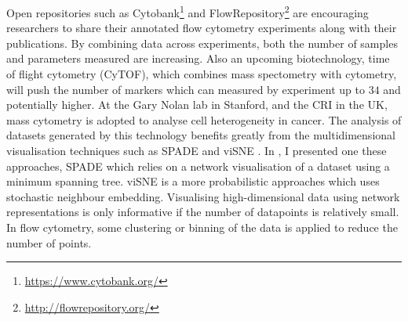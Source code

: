 Open repositories such as Cytobank\footnote{\url{https://www.cytobank.org/}} and FlowRepository\footnote{\url{http://flowrepository.org/}} \citep{Spidlen:2012hk} are encouraging researchers to share their annotated flow cytometry experiments along with their publications.
By combining data across experiments, both the number of samples and parameters measured are increasing.
Also an upcoming biotechnology, time of flight cytometry (CyTOF), which combines mass spectometry with cytometry, will push the number of markers which can measured by experiment up to $34$ and potentially higher.
At the Gary Nolan lab in Stanford, and the CRI in the UK, mass cytometry is adopted to analyse cell heterogeneity in cancer.
The analysis of datasets generated by this technology benefits greatly from the multidimensional visualisation techniques such as \gls{SPADE} \citep{Simonds:2011jh} and \gls{viSNE} \citep{Amir:2013jp}.
In , I presented one these approaches, \gls{SPADE} which relies on a network visualisation of a dataset using a minimum spanning tree.
\gls{viSNE} is a more probabilistic approaches which uses stochastic neighbour embedding.
Visualising high-dimensional data using network representations is only informative if the number of datapoints is relatively small.
In flow cytometry, some clustering or binning of the data is applied to reduce the number of points.  

